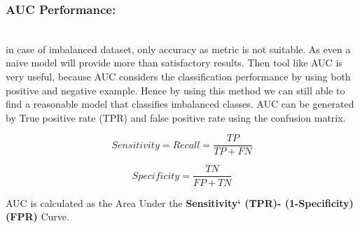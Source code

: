 \subsubsection{AUC Performance:}\hspace*{\fill} \\
in case of imbalanced dataset, only accuracy as metric is not suitable. As even a naive model will provide more than satisfactory results. Then tool like AUC is very useful, because AUC considers the classification performance by using both positive and negative example. Hence by using this method we can still able to find a reasonable model that classifies imbalanced classes. AUC can be generated by True positive rate (TPR) and false positive rate using the confusion matrix. 



\begin{equation} \label{eq:Sensitivity}
    Sensitivity = Recall = \frac{TP}{TP+FN}
\end{equation}

\begin{equation} \label{eq: Specificity}
    Specificity = \frac{TN}{FP+TN}
\end{equation}

AUC is calculated as the Area Under the \textbf{Sensitivity` (TPR)- (1-Specificity)(FPR)} Curve.